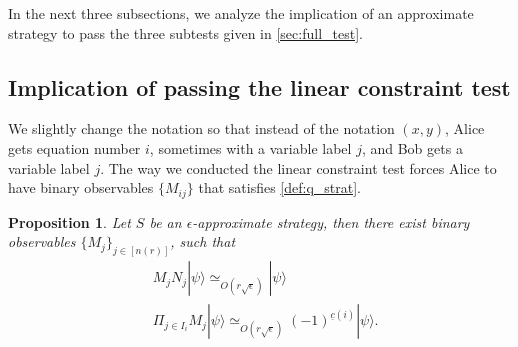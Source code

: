 \documentclass[11pt,letterpaper]{article}
\newcommand{\ket}[1]{|#1\rangle}
\newcommand{\1}{\mathbb{1}}
\newcommand{\nr}{n(r)}
\newcommand{\uc}{\underline{c}}
\newcommand{\ep}{\epsilon}
\newcommand{\se}{\sqrt{\epsilon}}
\newcommand{\appd}[1]{\simeq_{#1}}
\newtheorem{proposition}[theorem]{Proposition}
\theoremstyle{definition}
\begin{document}
In the next three subsections, we analyze the implication of an approximate strategy to pass the 
three subtests given in \cref{sec:full_test}.

\subsection{Implication of passing the linear constraint test}
\label{sec:imp_lct}
We slightly change the notation so that instead of the notation $(x,y)$, Alice gets equation number $i$, sometimes with a variable label $j$,
 and Bob gets a variable label $j$.
The way we conducted the linear constraint test forces Alice to have binary observables $\{M_{ij}\}$ that satisfies 
\cref{def:q_strat}.
\begin{proposition}
	\label{prop:lct_base}
	Let $S$ be an $\ep$-approximate strategy,
	then there exist binary observables $\{ M_j \}_{j \in [\nr]}$, such that
	\begin{align}
		&M_j N_j \ket{\psi} \appd{O(r\se)} \ket{\psi} \\
		&\Pi_{j \in I_i} M_j \ket{\psi} \appd{O(r\se)}(-1)^{\uc(i)} \ket{\psi}.
	\end{align}
\end{proposition}
\end{document}
